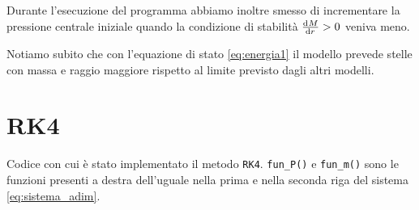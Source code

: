 \documentclass[a4paper, titlepage]{article}
\begin{document}
Durante l'esecuzione del programma abbiamo inoltre smesso di incrementare la pressione centrale iniziale quando la condizione di stabilità $\dv[]{M}{r} > 0$ veniva meno.

Notiamo subito che con l'equazione di stato \ref{eq:energia1} il modello prevede stelle con massa e raggio maggiore rispetto al limite previsto dagli altri modelli.












\newpage
\appendix

\section{RK4} \label{ap:RK4}
Codice con cui è stato implementato il metodo \texttt{RK4}. \texttt{fun\_P()} e \texttt{fun\_m()} sono le funzioni presenti a destra dell'uguale nella prima e nella seconda riga del sistema \ref{eq:sistema_adim}.
\end{document}
